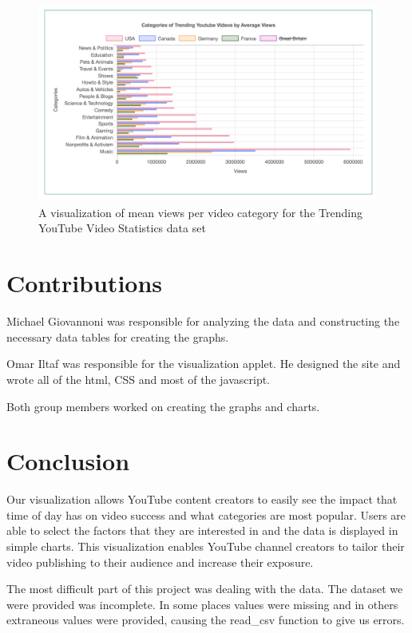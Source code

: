 \documentclass[journal]{vgtc}                %
\begin{document}
\begin{figure}[tb]
	\centering %
	\includegraphics[width=1\columnwidth]{category}
	\caption{A visualization of mean views per video category for the Trending YouTube Video Statistics data set}
	\label{fig:category}
\end{figure}

\section{Contributions}
Michael Giovannoni was responsible for analyzing the data and constructing the necessary data tables for creating the graphs.

Omar Iltaf was responsible for the visualization applet. He designed the site and wrote all of the html, CSS and most of the javascript.  

Both group members worked on creating the graphs and charts. 


\section{Conclusion}

Our visualization allows YouTube content creators to easily see the impact that time of day has on video success and what categories are most popular. Users are able to select the factors that they are interested in and the data is displayed in simple charts. This visualization enables YouTube channel creators to tailor their video publishing to their audience and increase their exposure. 

The most difficult part of this project was dealing with the data. The dataset we were provided was incomplete. In some places values were missing and in others extraneous values were provided, causing the read\_csv function to give us errors. 
\end{document}
